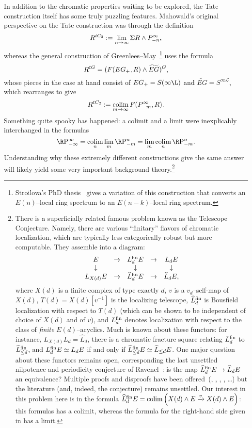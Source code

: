 In addition to the chromatic properties waiting to be explored, the Tate construction itself has some truly puzzling features.  Mahowald's original perspective on the Tate construction was through the definition \[R^{tC_2} := \lim_{n \to \infty} \Sigma R \wedge P^\infty_{-n},\] whereas the general construction of Greenlees--May~\cite{GreenleesMay}\footnote{Stroilova's PhD thesis~\cite{Stroilova} gives a variation of this construction that converts an \(E(n)\)--local ring spectrum to an \(E(n-k)\)--local ring spectrum.} uses the formula \[R^{tG} = (F(EG_+, R) \wedge \widetilde{EG})^G,\] whose pieces in the case at hand consist of \(EG_+ = S(\infty \L)\) and \(\widetilde{EG} = S^{\infty \mathcal L}\), which rearranges to give \[R^{tC_2} := \operatorname*{colim}_{m \to \infty} F(P^\infty_{-m}, R).\]  Something quite spooky has happened: a colimit and a limit were inexplicably interchanged in the formulas \[\RP^\infty_{-\infty} = \colim_n \lim_m \RP^n_{-m} = \lim_m \colim_n \RP^n_{-m}.\]  Understanding why these extremely different constructions give the same answer will likely yield some very important background theory.\footnote{There is a superficially related famous problem known as the Telescope Conjecture.  Namely, there are various ``finitary'' flavors of chromatic localization, which are typically less categorically robust but more computable.  They assemble into a diagram:
\[\begin{array}{ccccc}
E & \to & L_d^{\mathrm{fin}} E & \to & L_d E \\
\downarrow & & \downarrow & & \downarrow \\
L_{X(d)} E & \to & \widehat L_d^{\mathrm{fin}} E & \to & \widehat L_d E,
\end{array}\]
where \(X(d)\) is a finite complex of type exactly \(d\), \(v\) is a \(v_d\)--self-map of \(X(d)\), \(T(d) = X(d)[v^{-1}]\) is the localizing telescope, \(\widehat L_d^{\mathrm{fin}}\) is Bousfield localization with respect to \(T(d)\) (which can be shown to be independent of choice of \(X(d)\) and of \(v\)), and \(L_d^{\mathrm{fin}}\) denotes localization with respect to the class of \emph{finite} \(E(d)\)--acyclics.  Much is known about these functors: for instance, \(L_{X(d)} L_d = \widehat L_d\), there is a chromatic fracture square relating \(L_d^{\mathrm{fin}}\) to \(\widehat L_{\le d}^{\mathrm{fin}}\), and \(L_d^{\mathrm{fin}} E \simeq L_d E\) if and only if \(\widehat L_{\le d}^{\mathrm{fin}} E \simeq \widehat L_{\le d} E\).  One major question about these functors remains open, corresponding the last unsettled nilpotence and periodicity conjecture of Ravenel~\cite[Conjecture 10.5]{RavenelLocalizationWRTPeriodic}: is the map \(\widehat L_d^{\mathrm{fin}} E \to \widehat L_d E\) an equivalence?  Multiple proofs and disproofs have been offered~(\cite{RavenelObit}, \cite{MahowaldSadofsky}, \cite{Krause}, \cite{MRS}, \ldots) but the literature (and, indeed, the conjecture) remains unsettled.  Our interest in this problem here is in the formula \(\widehat L_d^{\mathrm{fin}} E = \operatorname*{colim}\left(X(d) \wedge E \xrightarrow{v} X(d) \wedge E\right)\): this formulas has a colimit, whereas the formula for the right-hand side given in  has a limit.}

